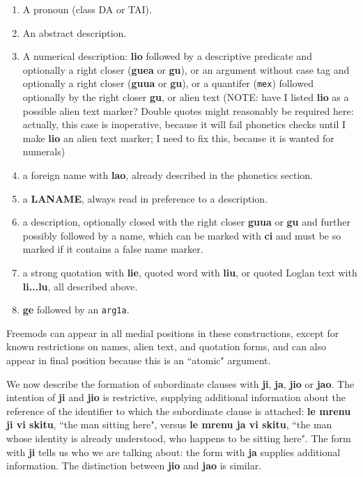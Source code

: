 \documentclass[12pt]{book}
\begin{document}
\begin{enumerate}

\item A pronoun (class DA or TAI).

\item An abstract description.

\item A numerical description:  {\bf lio} followed by a descriptive predicate and optionally a right closer ({\bf guea} or {\bf gu}), or an argument without case tag and optionally a right closer ({\bf guua} or {\bf gu}), or a quantifer ({\tt mex}) followed optionally by the right closer {\bf gu}, or alien text (NOTE:  have I listed {\bf lio} as a possible alien text marker?  Double quotes might reasonably be required here:  actually, this case is inoperative, because it will fail phonetics checks until I make {\bf lio} an alien text marker; I need to fix this, because it is wanted for numerals)

\item a foreign name with {\bf lao}, already described in the phonetics section.

\item a {\bf LANAME}, always read in preference to a description.

\item a description, optionally closed with  the right closer {\bf guua} or {\bf gu} and further possibly followed by a name, which can be marked with {\bf ci} and must be so marked if it contains a false name marker.

\item  a strong quotation with {\bf lie}, quoted word with {\bf liu}, or quoted Loglan text with {\bf li...lu}, all described above.

\item {\bf ge} followed by an {\tt arg1a}.


\end{enumerate}

Freemods can appear in all medial positions in these constructions, except for known restrictions on names, alien text, and quotation forms, and can also appear in final position
because this is an ``atomic" argument.

We now describe the formation of subordinate clauses with {\bf ji}, {\bf ja}, {\bf jio} or {\bf jao}.  The intention of {\bf ji} and {\bf jio} is restrictive, supplying additional information about the reference of the identifier to which the subordinate clause is attached:  {\bf le mrenu ji vi skitu}, ``the man sitting here",
versus {\bf le mrenu ja vi skitu}, ``the man whose identity is already understood, who happens to be sitting here".  The form with {\bf ji} tells us who we are talking about:  the form with {\bf ja} supplies additional information.  The distinction between {\bf jio} and {\bf jao} is similar.
\end{document}
